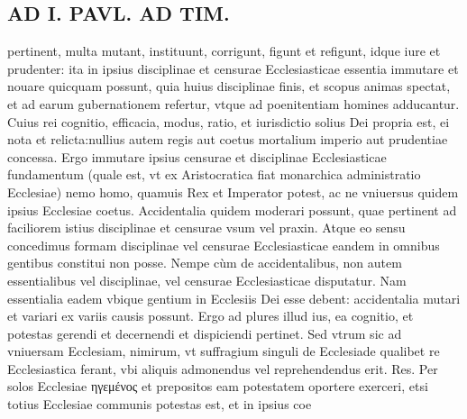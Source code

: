 \documentclass{article}
\begin{document}
\begin{pages}
\section*{AD I. PAVL. AD TIM. }
\marginpar{[ p.244 ]}\pstart pertinent, multa mutant, instituunt, corrigunt, figunt et refigunt, idque iure et prudenter: ita in ipsius disciplinae et censurae Ecclesiasticae essentia immutare et nouare quicquam possunt, quia huius disciplinae finis, et scopus animas spectat, et ad earum gubernationem refertur, vtque ad poenitentiam homines adducantur. Cuius rei cognitio, efficacia, modus, ratio, et iurisdictio solius Dei propria est, ei nota et relicta:nullius autem regis aut coetus mortalium imperio aut prudentiae concessa. Ergo immutare ipsius censurae et disciplinae Ecclesiasticae fundamentum (quale est, vt ex Aristocratica fiat monarchica administratio Ecclesiae) nemo homo, quamuis Rex et Imperator potest, ac ne vniuersus quidem ipsius Ecclesiae coetus. Accidentalia quidem moderari possunt, quae pertinent ad faciliorem istius disciplinae et censurae vsum vel praxin. Atque eo sensu concedimus formam disciplinae vel censurae Ecclesiasticae eandem in omnibus gentibus constitui non posse. Nempe cùm de accidentalibus, non autem essentialibus vel disciplinae, vel censurae Ecclesiasticae disputatur. Nam essentialia eadem vbique gentium in Ecclesiis Dei esse debent: accidentalia mutari et variari ex variis causis possunt. Ergo ad plures illud ius, ea cognitio, et potestas gerendi et decernendi et dispiciendi pertinet. Sed vtrum sic ad vniuersam Ecclesiam, nimirum, vt suffragium singuli de Ecclesiade qualibet re Ecclesiastica ferant, vbi aliquis admonendus vel reprehendendus erit. Res. Per solos Ecclesiae ηγεμένος et prepositos eam potestatem oportere exerceri, etsi totius Ecclesiae communis potestas est, et in ipsius coe\pend

\end{pages}
\end{document}
